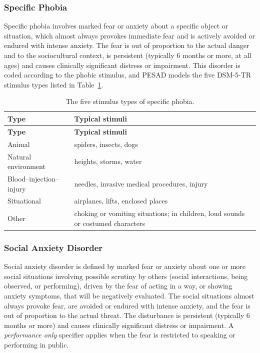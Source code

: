\subsubsection{Specific Phobia}

Specific phobia involves marked fear or anxiety about a specific object or
situation, which almost always provokes immediate fear and is actively avoided or
endured with intense anxiety. The fear is out of proportion to the actual danger
and to the sociocultural context, is persistent (typically 6 months or
more, at all ages) and causes clinically significant distress or impairment. This disorder is coded according to the phobic stimulus, and PESAD models the
five DSM-5-TR stimulus types listed in Table~\ref{tab:phobia-types}.

\begin{longtable}{@{}p{}p{}@{}}
  \caption{The five stimulus types of specific phobia.}%
  \label{tab:phobia-types}\\
  \toprule
  \textbf{Type} & \textbf{Typical stimuli} \\
  \midrule
  \endfirsthead
  \toprule
  \textbf{Type} & \textbf{Typical stimuli} \\
  \midrule
  \endhead
  \bottomrule
  \endlastfoot
  Animal & spiders, insects, dogs \\
  Natural environment & heights, storms, water \\
  Blood--injection--injury & needles, invasive medical procedures, injury \\
  Situational & airplanes, lifts, enclosed places \\
  Other & choking or vomiting situations; in children, loud sounds or costumed
          characters \\
\end{longtable}

\subsubsection{Social Anxiety Disorder}

Social anxiety disorder is defined by marked fear or anxiety about one or more
social situations involving possible scrutiny by others (social interactions,
being observed, or performing), driven by the fear of acting in a way, or showing
anxiety symptoms, that will be negatively evaluated. The social situations almost
always provoke fear, are avoided or endured with intense anxiety, and the fear is
out of proportion to the actual threat. The disturbance is persistent
(typically 6 months or more) and causes clinically significant distress
or impairment. A \emph{performance only} specifier applies when the fear is
restricted to speaking or performing in public.

